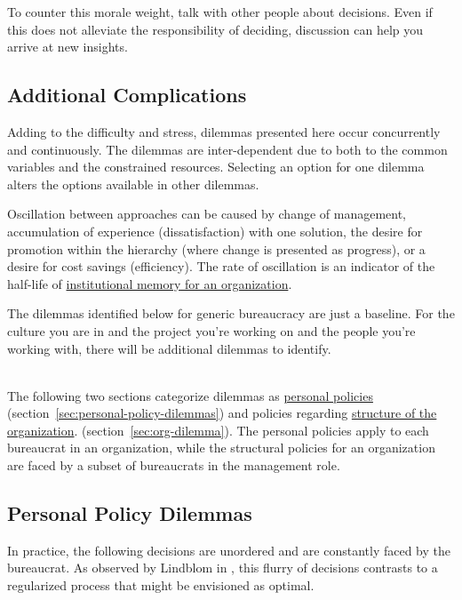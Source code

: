 To counter this morale weight, talk with other people about decisions. 
Even if this does not alleviate the responsibility of deciding, discussion can help you arrive at new insights. 

\subsection*{Additional Complications}
Adding to the difficulty and stress, dilemmas presented here occur concurrently and continuously. The dilemmas are inter-dependent due to both to the common variables and the constrained resources.
Selecting an option for one dilemma alters the options available in other dilemmas.

Oscillation between approaches can be caused by change of management, accumulation of experience (dissatisfaction) with one solution, the desire for promotion within the hierarchy (where change is presented as progress), or a desire for cost savings (efficiency). The rate of oscillation is an indicator of the half-life of \href{https://en.wikipedia.org/wiki/Institutional_memory}{institutional memory for an organization}.  

The dilemmas identified below for generic bureaucracy are just a baseline. For the culture you are in and the project you're working on and the people you're working with, there will be additional dilemmas to identify. 

\ \\

The following two sections categorize dilemmas as \hyperref[sec:personal-policy-dilemmas]{personal policies} 
\ifsectionref
(section~\ref{sec:personal-policy-dilemmas}) 
\fi
and policies regarding \hyperref[sec:org-dilemma]{structure of the organization}.
\ifsectionref
(section~\ref{sec:org-dilemma}). 
\fi
The personal policies apply to each bureaucrat in an organization, while the structural policies for an organization are faced by a subset of bureaucrats in the management role. 

\subsection*{Personal Policy Dilemmas \label{sec:personal-policy-dilemmas}}

In practice, the following decisions are unordered and are constantly faced by the bureaucrat. As observed by Lindblom in \cite{1959_Lindblom}, this flurry of decisions contrasts to a regularized process that might be envisioned as optimal.


